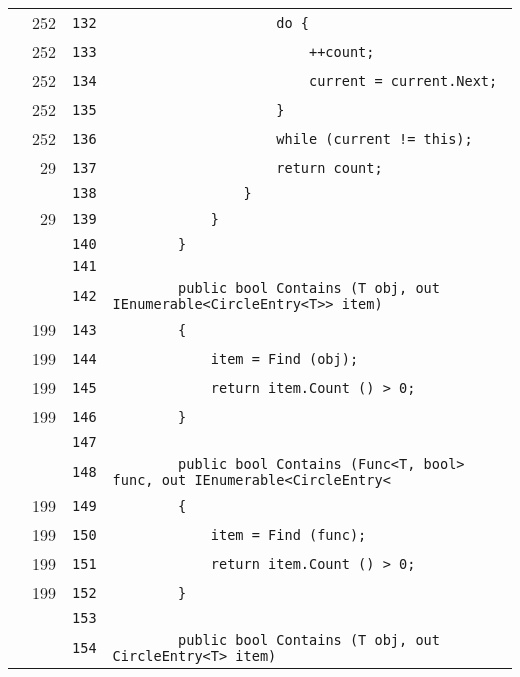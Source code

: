 \documentclass[a4paper,10pt]{article}
\begin{document}
\begin{longtable}[l]{lrrl}
\cellcolor{green} & 252 & \verb~132~ & \verb~                    do {~\\
\cellcolor{green} & 252 & \verb~133~ & \verb~                        ++count;~\\
\cellcolor{green} & 252 & \verb~134~ & \verb~                        current = current.Next;~\\
\cellcolor{green} & 252 & \verb~135~ & \verb~                    }~\\
\cellcolor{green} & 252 & \verb~136~ & \verb~                    while (current != this);~\\
\cellcolor{green} & 29 & \verb~137~ & \verb~                    return count;~\\
\cellcolor{gray} &  & \verb~138~ & \verb~                }~\\
\cellcolor{green} & 29 & \verb~139~ & \verb~            }~\\
\cellcolor{gray} &  & \verb~140~ & \verb~        }~\\
\cellcolor{gray} &  & \verb~141~ & \verb~~\\
\cellcolor{gray} &  & \verb~142~ & \verb~        public bool Contains (T obj, out IEnumerable<CircleEntry<T>> item)~\\
\cellcolor{green} & 199 & \verb~143~ & \verb~        {~\\
\cellcolor{green} & 199 & \verb~144~ & \verb~            item = Find (obj);~\\
\cellcolor{green} & 199 & \verb~145~ & \verb~            return item.Count () > 0;~\\
\cellcolor{green} & 199 & \verb~146~ & \verb~        }~\\
\cellcolor{gray} &  & \verb~147~ & \verb~~\\
\cellcolor{gray} &  & \verb~148~ & \verb~        public bool Contains (Func<T, bool> func, out IEnumerable<CircleEntry<~\\
\cellcolor{green} & 199 & \verb~149~ & \verb~        {~\\
\cellcolor{green} & 199 & \verb~150~ & \verb~            item = Find (func);~\\
\cellcolor{green} & 199 & \verb~151~ & \verb~            return item.Count () > 0;~\\
\cellcolor{green} & 199 & \verb~152~ & \verb~        }~\\
\cellcolor{gray} &  & \verb~153~ & \verb~~\\
\cellcolor{gray} &  & \verb~154~ & \verb~        public bool Contains (T obj, out CircleEntry<T> item)~\\

\end{longtable}
\end{document}
